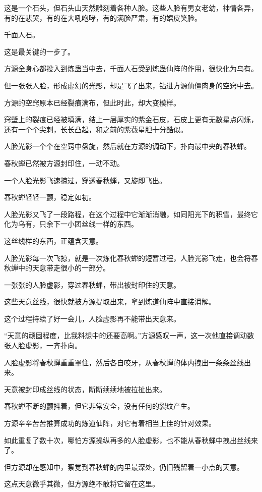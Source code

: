 \begin{this_body}
这是一个石头，但石头山天然雕刻着各种人脸。这些人脸有男女老幼，神情各异，有的在悲哭，有的在大吼咆哮，有的满脸严肃，有的嬉皮笑脸。

千面人石。

这是最关键的一步了。

方源全身心都投入到炼蛊当中去，千面人石受到炼蛊仙阵的作用，很快化为乌有。

但一张张人脸，形成虚幻的光影，却是飞了出来，钻进方源仙僵肉身的空窍中去。

方源的空窍原本已经裂痕满布，但此时此，却大变模样。

窍壁上的裂痕已经被填满，结上一层厚实的紫金石皮，石皮上更有无数星点闪烁，还有一个个尖刺，长长凸起，和之前的紫薇星胆十分酷似。

人脸光影一个个在空窍中盘旋，然后就在方源的调动下，扑向最中央的春秋蝉。

春秋蝉已然被方源封印住，一动不动。

一个人脸光影飞速掠过，穿透春秋蝉，又旋即飞出。

春秋蝉轻轻一颤，稳定如初。

人脸光影又飞了一段路程，在这个过程中它渐渐消融，如同阳光下的积雪，最终它化为乌有，只余下一小团丝线一样的东西。

这丝线样的东西，正蕴含天意。

人脸光影每一次飞掠，就是一次炼化春秋蝉的短暂过程，人脸光影飞走，也会将春秋蝉中的天意带走很小的一部分。

一张张的人脸虚影，穿过春秋蝉，带出被封印住的天意。

这些天意丝线，很快就被方源提取出来，拿到炼道仙阵中直接消解。

这个过程持续了好一会儿，人脸虚影再不能带出天意来。

“天意的顽固程度，比我料想中的还要高啊。”方源感叹一声，这一次他直接调动数张人脸虚影，一齐扑向。

人脸虚影将春秋蝉重重罩住，然后各自咬牙，从春秋蝉的体内拽出一条条丝线出来。

天意被封印成丝线的状态，断断续续地被拉扯出来。

春秋蝉不断的颤抖着，但它非常安全，没有任何的裂纹产生。

方源辛辛苦苦推算成功的炼道仙阵，对它有着相当上佳的针对效果。

如此重复了数十次，哪怕方源操纵再多的人脸虚影，也不能从春秋蝉中拽出丝线来了。

但方源却在感知中，察觉到春秋蝉的内里最深处，仍旧残留着一小点的天意。

这点天意微乎其微，但方源绝不敢将它留在这里。


\end{this_body}
